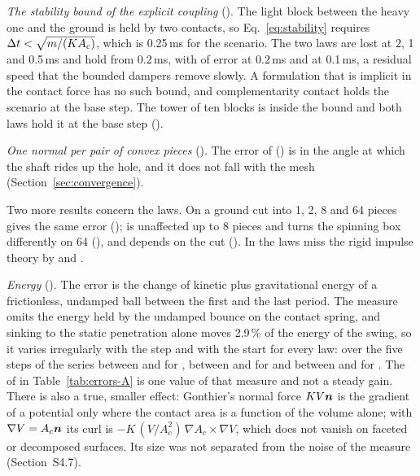\emph{The stability bound of the explicit coupling} (). The light block between
the heavy one and the ground is held by two contacts, so Eq.~\eqref{eq:stability} requires
$\Delta t < \sqrt{m/(K A_c)}$, which is 0.25\,ms for the scenario.
The two laws are lost at 2, 1 and 0.5\,ms and hold from 0.2\,ms, with
 of error at 0.2\,ms and
 at 0.1\,ms, a residual speed that the bounded dampers
remove slowly. A formulation that is implicit in the contact force has no such bound, and
complementarity contact holds the scenario at the base step. The tower of ten blocks is inside the
bound and both laws hold it at the base step ().

\emph{One normal per pair of convex pieces} (). The error of 
() is in the angle at which the shaft rides up the hole, and it
does not fall with the mesh (Section~\ref{sec:convergence}).

Two more results concern the laws. On a ground cut into 1, 2, 8 and 64 pieces
 gives the same error ();  is
unaffected up to 8 pieces and turns the spinning box differently on 64
(), and  depends on the cut
(). In  the laws miss the rigid impulse theory by
 and .

\emph{Energy} (). The error is the change of kinetic plus gravitational energy of a
frictionless, undamped ball between the first and the last period. The measure omits the energy
held by the undamped bounce on the contact spring, and sinking to the static penetration alone
moves 2.9\,\% of the energy of the swing, %
so it varies irregularly with the step and with the start for every law: over the five steps of
the series between  and  for
, between  and  for 
and between  and  for
. The  of  in
Table~\ref{tab:errors-A} is one value of that measure and not a steady gain. There is also a
true, smaller effect: Gonthier's normal force $K V\boldsymbol{n}$ is the gradient of a potential only where
the contact area is a function of the volume alone; with $\nabla V = A_c\boldsymbol{n}$ its curl is
$-K\,(V/A_c^2)\,\nabla A_c\times\nabla V$, which does not vanish on faceted or decomposed
surfaces. Its size was not separated from the noise of the measure (Section~S4.7).


